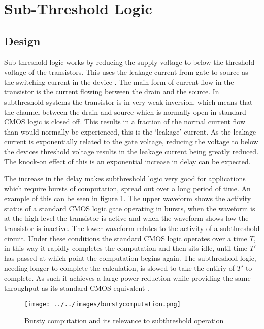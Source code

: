 \section{Sub-Threshold Logic}
\label{sec:subthresh}

\subsection{Design}
Sub-threshold logic works by reducing the supply voltage to below the threshold voltage of the transistors.
This uses the leakage current from gate to source as the switching current in the device \cite{ULPSubThresh}.
The main form of current flow in the transistor is the current flowing between the drain and the source.
In subthreshold systems the transistor is in very weak inversion, which means that the channel between the drain and source which is normally open in standard CMOS logic is closed off.
This results in a fraction of the normal current flow than would normally be experienced, this is the `leakage' current.
As the leakage current is exponentially related to the gate voltage, reducing the voltage to below the devices threshold voltage results in the leakage current being greatly reduced.
The knock-on effect of this is an exponential increase in delay can be expected.

The increase in the delay makes subthreshold logic very good for applications which require bursts of computation, spread out over a long period of time.
An example of this can be seen in figure \ref{fig:burstST}.
The upper waveform shows the activity status of a standard CMOS logic gate operating in bursts, when the waveform is at the high level the transistor is active and when the waveform shows low the transistor is inactive.
The lower waveform relates to the activity of a subthreshold circuit.
Under these conditions the standard CMOS logic operates over a time $T$, in this way it rapidly completes the computation and then sits idle, until time $T'$ has passed at which point the computation begins again.
The subthreshold logic, needing longer to complete the calculation, is slowed to take the entiriy of $T'$ to complete.
As such it achieves a large power reduction while providing the same throughput as its standard CMOS equivalent \cite{IEEEVLSIRobustSTL,ULPSubThresh}.

\begin{figure}
	\centering
	\texttt{[image: ../../images/burstycomputation.png]}
	\caption{Bursty computation and its relevance to subthreshold operation \cite{IEEEVLSIRobustSTL}}
	\label{fig:burstST}
\end{figure}

